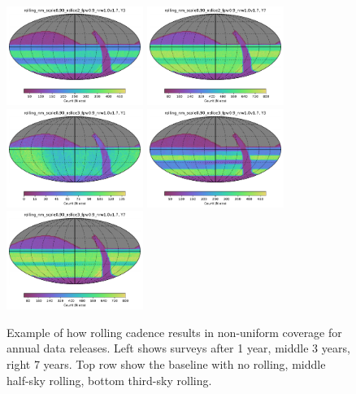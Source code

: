 \documentclass[modern]{aastex62}
\begin{document}
\begin{figure}
\includegraphics[width=1.75in]{plots/yearly_release/rolling_nm_scale0_90_nslice2_fpw0_9_nrw1_0v1_7_Count_nightlt1095_and_note_not_like_DD_HEAL_SkyMap.pdf}
\includegraphics[width=1.75in]{plots/yearly_release/rolling_nm_scale0_90_nslice2_fpw0_9_nrw1_0v1_7_Count_night_lt_2556_and_note_not_like_DD_HEAL_SkyMap.pdf}\\
\includegraphics[width=1.75in]{plots/yearly_release/rolling_nm_scale0_90_nslice3_fpw0_9_nrw1_0v1_7_Count_night_lt_365_and_note_not_like_DD_HEAL_SkyMap.pdf}
\includegraphics[width=1.75in]{plots/yearly_release/rolling_nm_scale0_90_nslice3_fpw0_9_nrw1_0v1_7_Count_nightlt1095_and_note_not_like_DD_HEAL_SkyMap.pdf}
\includegraphics[width=1.75in]{plots/yearly_release/rolling_nm_scale0_90_nslice3_fpw0_9_nrw1_0v1_7_Count_night_lt_2556_and_note_not_like_DD_HEAL_SkyMap.pdf}
\caption{Example of how rolling cadence results in non-uniform coverage for annual data releases. Left shows surveys after 1 year, middle 3 years, right 7 years. Top row show the baseline with no rolling, middle half-sky rolling, bottom third-sky rolling. \label{fig:years}}
\end{figure}
\end{document}
